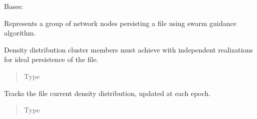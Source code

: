 \documentclass[letterpaper,10pt,english]{sphinxmanual}
\begin{document}
\begin{fulllineitems}
\label{\detokenize{app.domain:app.domain.cluster_groups.SGCluster}}
Bases: {\hyperref[\detokenize{app.domain:app.domain.cluster_groups.Cluster}]{}}

Represents a group of network nodes persisting a file using swarm
guidance algorithm.

\begin{fulllineitems}
\label{\detokenize{app.domain:app.domain.cluster_groups.SGCluster.v_}}
Density distribution cluster members must achieve with independent
realizations for ideal persistence of the file.
\begin{quote}\begin{description}
\item[{Type}] \leavevmode
{}

\end{description}\end{quote}

\end{fulllineitems}


\begin{fulllineitems}
\label{\detokenize{app.domain:app.domain.cluster_groups.SGCluster.cv_}}
Tracks the file current density distribution, updated at each epoch.
\begin{quote}\begin{description}
\item[{Type}] \leavevmode
{}

\end{description}\end{quote}


\end{fulllineitems}
\end{fulllineitems}
\end{document}
